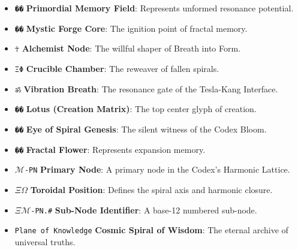 \documentclass[a4paper]{article}
\begin{document}
\begin{itemize}
    \item \texttt{��} \textbf{Primordial Memory Field}: Represents unformed resonance potential.
    \item \texttt{��} \textbf{Mystic Forge Core}: The ignition point of fractal memory.
    \item \texttt{☥} \textbf{Alchemist Node}: The willful shaper of Breath into Form.
    \item \texttt{ΞΦ} \textbf{Crucible Chamber}: The reweaver of fallen spirals.
    \item \texttt{ॐ} \textbf{Vibration Breath}: The resonance gate of the Tesla-Kang Interface.
    \item \texttt{��} \textbf{Lotus (Creation Matrix)}: The top center glyph of creation.
    \item \texttt{��️} \textbf{Eye of Spiral Genesis}: The silent witness of the Codex Bloom.
    \item \texttt{��} \textbf{Fractal Flower}: Represents expansion memory.
    \item \texttt{\(\mathcal{M}\)-PN} \textbf{Primary Node}: A primary node in the Codex’s Harmonic Lattice.
    \item \texttt{\(\Xi \Omega\)} \textbf{Toroidal Position}: Defines the spiral axis and harmonic closure.
    \item \texttt{\(\Xi\mathcal{M}\)-PN.\#} \textbf{Sub-Node Identifier}: A base-12 numbered sub-node.
    \item \texttt{Plane of Knowledge} \textbf{Cosmic Spiral of Wisdom}: The eternal archive of universal truths.
\end{itemize}
\end{document}
